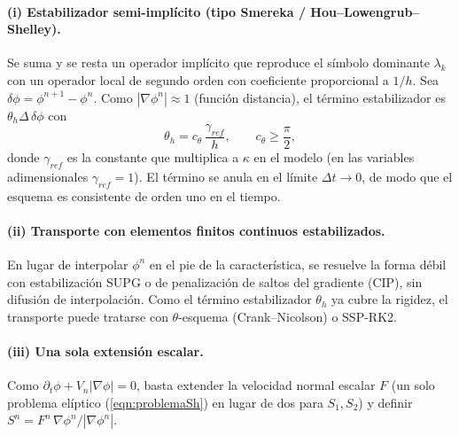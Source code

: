 \paragraph{(i) Estabilizador semi-implícito (tipo Smereka / Hou--Lowengrub--Shelley).}
Se suma y se resta un operador implícito que reproduce el símbolo dominante $\lambda_k$ con un operador local de segundo orden con coeficiente proporcional a $1/h$. Sea $\delta\phi=\phi^{n+1}-\phi^n$. Como $|\nabla\phi^n|\approx 1$ (función distancia), el término estabilizador es $\theta_h\Delta\,\delta\phi$ con
\begin{equation}
	\theta_h = c_\theta\,\frac{\gamma_{ref}}{h},\qquad c_\theta\ge \frac{\pi}{2},
	\label{eqn:thetah}
\end{equation}
donde $\gamma_{ref}$ es la constante que multiplica a $\kappa$ en el modelo (en las variables adimensionales $\gamma_{ref}=1$). El término se anula en el límite $\Delta t\to 0$, de modo que el esquema es consistente de orden uno en el tiempo.

\paragraph{(ii) Transporte con elementos finitos continuos estabilizados.}
En lugar de interpolar $\phi^n$ en el pie de la característica, se resuelve la forma débil con estabilización SUPG o de penalización de saltos del gradiente (CIP), sin difusión de interpolación. Como el término estabilizador $\theta_h$ ya cubre la rigidez, el transporte puede tratarse con $\theta$-esquema (Crank--Nicolson) o SSP-RK2.

\paragraph{(iii) Una sola extensión escalar.}
Como $\partial_t\phi+V_n|\nabla\phi|=0$, basta extender la velocidad normal escalar $F$ (un solo problema elíptico (\ref{eqn:problemaSh}) en lugar de dos para $S_1,S_2$) y definir $S^n=F^n\,\nabla\phi^n/|\nabla\phi^n|$.

